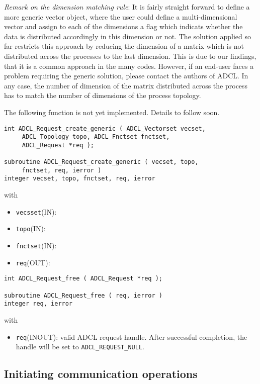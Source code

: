 {\it Remark on the dimension matching rule}: It is fairly straight forward to define a more generic vector object, where the user could define a multi-dimensional vector and assign to each of the dimensions a flag which indicats whether the data is distributed accordingly in this dimension or not. The solution applied so far restricts this approach by reducing the dimension of a matrix which is not distributed across the processes to the last dimension. This is due to our findings, that it is a common approach in the many codes. However, if an end-user faces a problem requiring the generic solution, please contact the authors of ADCL. In any case, the number of  dimension of the matrix distributed across the process has to match the number of dimensions of the process topology.


The following function is not yet implemented. Details to follow soon.

\begin{verbatim}
int ADCL_Request_create_generic ( ADCL_Vectorset vecset, 
     ADCL_Topology topo, ADCL_Fnctset fnctset, 
     ADCL_Request *req );
      
subroutine ADCL_Request_create_generic ( vecset, topo, 
     fnctset, req, ierror )
integer vecset, topo, fnctset, req, ierror
\end{verbatim}
with
\begin{itemize}
\item {\tt vecsset}(IN):
\item {\tt topo}(IN):
\item {\tt fnctset}(IN):
\item {\tt req}(OUT):
\end{itemize}
\hspace{1cm}

\begin{verbatim}
int ADCL_Request_free ( ADCL_Request *req );

subroutine ADCL_Request_free ( req, ierror )
integer req, ierror
\end{verbatim}
with
\begin{itemize}
\item {\tt req}(INOUT): valid ADCL request handle. After successful completion, the handle will be set to {\tt ADCL\_REQUEST\_NULL}.
\end{itemize}
\hspace{1cm}

\subsection{Initiating communication operations}

